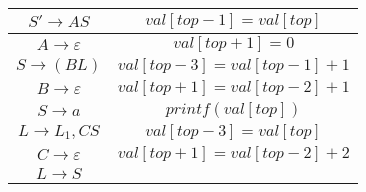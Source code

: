 \documentclass{article}
\begin{document}
\begin{solution}
\begin{table}[H]
\begin{tabular}{|c|c|}
				\hline
				$S' \to AS$ & $val[top - 1] = val[top]$ \\
				\hline
				$A \to \varepsilon$ & $val[top + 1] = 0$ \\
				\hline
				$S \to (BL)$ & $val[top - 3] = val[top - 1] + 1$ \\
				\hline
				$B \to \varepsilon$ & $val[top + 1] = val[top - 2] + 1$ \\
				\hline
				$S \to a$ & $printf(val[top])$ \\
				\hline
				$L \to L_1, CS$ & $val[top - 3] = val[top]$ \\
				\hline
				$C \to \varepsilon$ & $val[top + 1] = val[top - 2] + 2$ \\
				\hline
				$L \to S$ &  \\
				\hline
			\end{tabular}
		\end{table}
	\end{solution}
	
\end{document}
